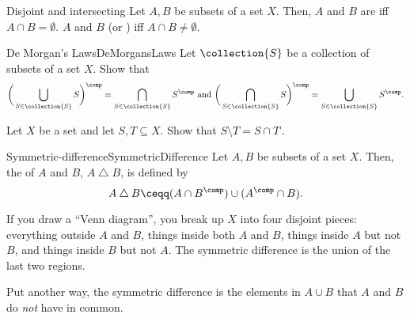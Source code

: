 \begin{dfn}{Disjoint and intersecting}{}
Let $A,B$ be subsets of a set $X$.  Then, $A$ and $B$ are  iff $A\cap B=\emptyset$.  $A$ and $B$  (or ) iff $A\cap B\neq \emptyset$.
\end{dfn}
\begin{exr}{De Morgan's Laws}{DeMorgansLaws}
Let $\collection{S}$ be a collection of subsets of a set $X$.  Show that
\begin{equation}
\bigg( \bigcup _{S\in \collection{S}}S\bigg) ^{\comp}=\bigcap _{S\in \collection{S}}S^{\comp}\text{ and }\bigg( \bigcap _{S\in \collection{S}}S\bigg) ^{\comp}=\bigcup _{S\in \collection{S}}S^{\comp}.
\end{equation}
\end{exr}
\begin{exr}{}{}
Let $X$ be a set and let $S,T\subseteq X$.  Show that $S\setminus T=S\cap T^{\comp}$.
\end{exr}
\begin{dfn}{Symmetric-difference}{SymmetricDifference}
	Let $A,B$ be subsets of a set $X$.  Then, the  of $A$ and $B$, $A\bigtriangleup B$, is defined by
	\begin{equation}
	A\bigtriangleup B\ceqq (A\cap B^{\comp})\cup (A^{\comp}\cap B).
	\end{equation}
	\begin{rmk}
		If you draw a ``Venn diagram'', you break up $X$ into four disjoint pieces:  everything outside $A$ and $B$, things inside both $A$ and $B$, things inside $A$ but not $B$, and things inside $B$ but not $A$.  The symmetric difference is the union of the last two regions.
		
		Put another way, the symmetric difference is the elements in $A\cup B$ that $A$ and $B$ do \emph{not} have in common.
	\end{rmk}
\end{dfn}

